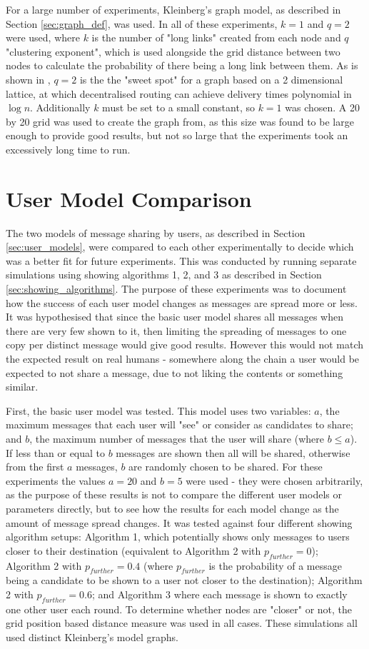 \documentclass[bsc,frontabs,twoside,singlespacing,parskip,deptreport]{infthesis}     %
\begin{document}
For a large number of experiments, Kleinberg's graph model, as described in Section \ref{sec:graph_def}, was used. In all of these experiments, $k=1$ and $q=2$ were used, where $k$ is the number of "long links" created from each node and $q$ "clustering exponent", which is used alongside the grid distance between two nodes to calculate the probability of there being a long link between them. As is shown in \cite{Kleinberg00},  $q=2$ is the the "sweet spot" for a graph based on a 2 dimensional lattice, at which decentralised routing can achieve delivery times polynomial in $\log n$. Additionally $k$ must be set to a small constant, so $k=1$ was chosen. A 20 by 20 grid was used to create the graph from, as this size was found to be large enough to provide good results, but not so large that the experiments took an excessively long time to run.


\section{User Model Comparison}
The two models of message sharing by users, as described in Section \ref{sec:user_models}, were compared to each other experimentally to decide which was a better fit for future experiments. This was conducted by running separate simulations using showing algorithms 1, 2, and 3 as described in Section \ref{sec:showing_algorithms}. The purpose of these experiments was to document how the success of each user model changes as messages are spread more or less. It was hypothesised that since the basic user model shares all messages when there are very few shown to it, then limiting the spreading of messages to one copy per distinct message would give good results. However this would not match the expected result on real humans - somewhere along the chain a user would be expected to not share a message, due to not liking the contents or something similar.

First, the basic user model was tested. This model uses two variables: $a$, the maximum messages that each user will "see" or consider as candidates to share; and $b$, the maximum number of messages that the user will share (where $b \leq a$). If less than or equal to $b$ messages are shown then all will be shared, otherwise from the first $a$ messages, $b$ are randomly chosen to be shared. For these experiments the values $a = 20$ and $b = 5$ were used - they were chosen arbitrarily, as the purpose of these results is not to compare the different user models or parameters directly, but to see how the results for each model change as the amount of message spread changes. It was tested against four different showing algorithm setups: Algorithm 1, which potentially shows only messages to users closer to their destination (equivalent to Algorithm 2 with $p_{further}=0$); Algorithm 2 with $p_{further}=0.4$ (where $p_{further}$ is the probability of a message being a candidate to be shown to a user not closer to the destination); Algorithm 2 with $p_{further}=0.6$; and Algorithm 3 where each message is shown to exactly one other user each round. To determine whether nodes are "closer" or not, the grid position based distance measure was used in all cases. These simulations all used distinct Kleinberg's model graphs.
\end{document}
